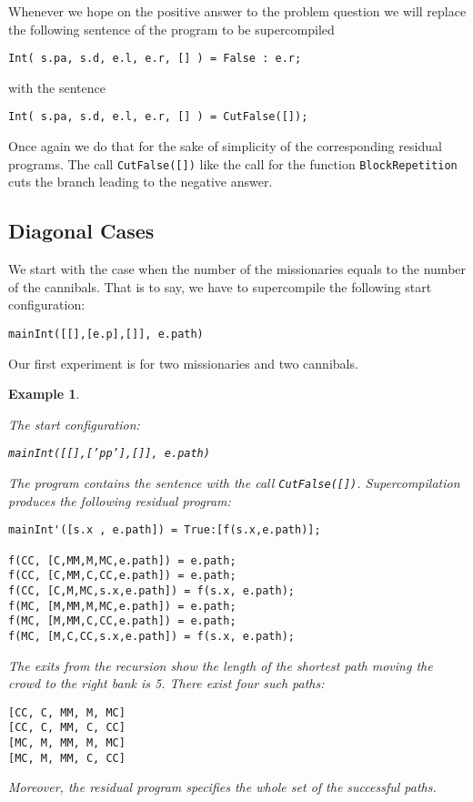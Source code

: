 \documentclass[preprint]{sigplanconf}
\newtheorem{example}{Example}
\begin{document}
Whenever we hope on the positive answer to the problem question we will replace the following sentence of the program to be supercompiled 

\noindent
\begin{verbatim}
Int( s.pa, s.d, e.l, e.r, [] ) = False : e.r;
\end{verbatim}
\noindent
with the sentence

\noindent
\begin{verbatim}
Int( s.pa, s.d, e.l, e.r, [] ) = CutFalse([]);
\end{verbatim}

Once again we do that for the sake of simplicity of the corresponding residual programs. The call \texttt{CutFalse([])} like the call for the function \texttt{BlockRepetition} cuts the branch leading to the negative answer. 


\subsection{Diagonal Cases}

We start with the case when the number of the missionaries equals to the number of the cannibals. That is to say, we have to supercompile the following start configuration: 
\begin{center}
\texttt{mainInt([[],[e.p],[]], e.path)}
\end{center}

Our first experiment is for two missionaries and two cannibals.

\begin{example}\label{Example1}

The start configuration: 
\begin{center}
\texttt{mainInt([[],['pp'],[]], e.path)}
\end{center}
The program contains the sentence with the call \texttt{CutFalse([])}.
Supercompilation produces the following residual program:

\noindent
\begin{verbatim}
mainInt'([s.x , e.path]) = True:[f(s.x,e.path)];

f(CC, [C,MM,M,MC,e.path]) = e.path;
f(CC, [C,MM,C,CC,e.path]) = e.path;
f(CC, [C,M,MC,s.x,e.path]) = f(s.x, e.path);
f(MC, [M,MM,M,MC,e.path]) = e.path;
f(MC, [M,MM,C,CC,e.path]) = e.path;
f(MC, [M,C,CC,s.x,e.path]) = f(s.x, e.path);
\end{verbatim}

The exits from the recursion show the length of the shortest path moving the crowd to the right bank is 5. There exist four such paths:

\noindent
\begin{verbatim}
[CC, C, MM, M, MC]
[CC, C, MM, C, CC]
[MC, M, MM, M, MC]
[MC, M, MM, C, CC]
\end{verbatim}

Moreover, the residual program specifies the whole set of the successful paths.

\end{example}
\end{document}
